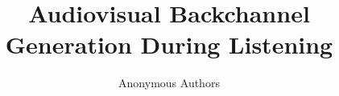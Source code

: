 \documentclass[10pt,twocolumn,letterpaper]{article}
\title{Audiovisual Backchannel Generation During Listening}
\author{Anonymous Authors}
\begin{document}
\maketitle







\clearpage
{\small}
\end{document}
